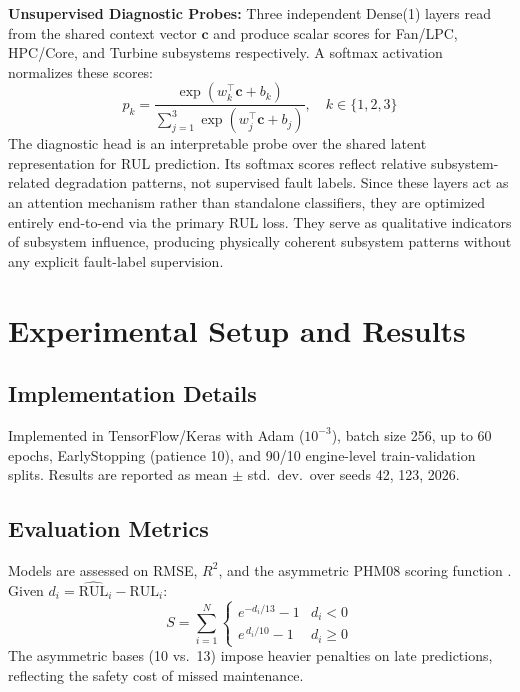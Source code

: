 \documentclass[conference]{IEEEtran}
\begin{document}
\textbf{Unsupervised Diagnostic Probes:} Three independent Dense(1) layers read from the shared context vector $\mathbf{c}$ and produce scalar scores for Fan/LPC, HPC/Core, and Turbine subsystems respectively. A softmax activation normalizes these scores:
\begin{equation}
    p_k = \frac{\exp(w_k^\top \mathbf{c} + b_k)}{\sum_{j=1}^{3}\exp(w_j^\top \mathbf{c} + b_j)},\quad k\in\{1,2,3\}
\end{equation}
The diagnostic head is an interpretable probe over the shared latent representation for RUL prediction. Its softmax scores reflect relative subsystem-related degradation patterns, not supervised fault labels. Since these layers act as an attention mechanism rather than standalone classifiers, they are optimized entirely end-to-end via the primary RUL loss. They serve as qualitative indicators of subsystem influence, producing physically coherent subsystem patterns without any explicit fault-label supervision.

\section{Experimental Setup and Results}

\subsection{Implementation Details}

Implemented in TensorFlow/Keras with Adam ($10^{-3}$), batch size 256, up to 60 epochs, EarlyStopping (patience 10), and 90/10 engine-level train-validation splits. Results are reported as mean $\pm$ std.\ dev.\ over seeds 42, 123, 2026.

\subsection{Evaluation Metrics}

Models are assessed on RMSE, $R^2$, and the asymmetric PHM08 scoring function \cite{b13}. Given $d_i = \hat{\mathrm{RUL}}_i - \mathrm{RUL}_i$:
\begin{equation}
    S = \sum_{i=1}^{N}
    \begin{cases}
      e^{-d_i/13} - 1 & d_i < 0 \\
      e^{\,d_i/10}  - 1 & d_i \geq 0
    \end{cases}
\end{equation}
The asymmetric bases (10 vs.\ 13) impose heavier penalties on late predictions, reflecting the safety cost of missed maintenance.
\end{document}
